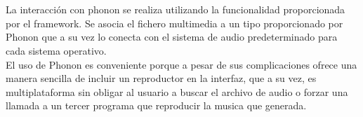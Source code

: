 \newline
\\
\\La interacción con phonon se realiza utilizando la funcionalidad proporcionada por el framework. Se asocia el fichero multimedia a un tipo proporcionado por Phonon que a su vez lo conecta con el sistema de audio predeterminado para cada sistema operativo.
\\El uso de Phonon es conveniente porque a pesar de sus complicaciones ofrece una manera sencilla de incluir un reproductor en la interfaz, que a su vez, es multiplataforma sin obligar al usuario a buscar el archivo de audio o forzar una llamada a un tercer programa que reproducir la musica que generada.
